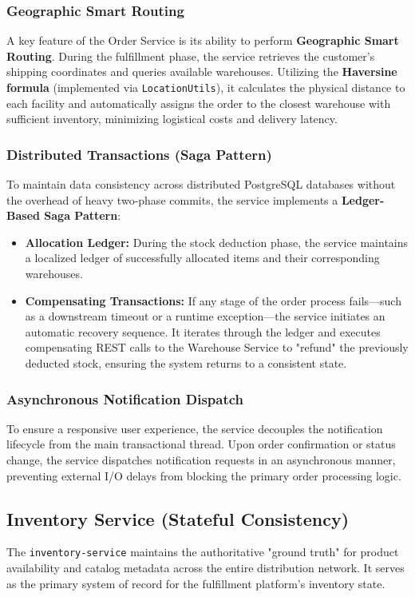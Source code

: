 \documentclass[12pt,a4paper]{report}
\begin{document}
\subsubsection{Geographic Smart Routing}
A key feature of the Order Service is its ability to perform \textbf{Geographic Smart Routing}. During the fulfillment phase, the service retrieves the customer's shipping coordinates and queries available warehouses. Utilizing the \textbf{Haversine formula} (implemented via \texttt{LocationUtils}), it calculates the physical distance to each facility and automatically assigns the order to the closest warehouse with sufficient inventory, minimizing logistical costs and delivery latency.

\subsubsection{Distributed Transactions (Saga Pattern)}
To maintain data consistency across distributed PostgreSQL databases without the overhead of heavy two-phase commits, the service implements a \textbf{Ledger-Based Saga Pattern}:
\begin{itemize}
    \item \textbf{Allocation Ledger:} During the stock deduction phase, the service maintains a localized ledger of successfully allocated items and their corresponding warehouses.
    \item \textbf{Compensating Transactions:} If any stage of the order process fails---such as a downstream timeout or a runtime exception---the service initiates an automatic recovery sequence. It iterates through the ledger and executes compensating REST calls to the Warehouse Service to "refund" the previously deducted stock, ensuring the system returns to a consistent state.
\end{itemize}

\subsubsection{Asynchronous Notification Dispatch}
To ensure a responsive user experience, the service decouples the notification lifecycle from the main transactional thread. Upon order confirmation or status change, the service dispatches notification requests in an asynchronous manner, preventing external I/O delays from blocking the primary order processing logic.

\subsection{Inventory Service (Stateful Consistency)}
The \texttt{inventory-service} maintains the authoritative "ground truth" for product availability and catalog metadata across the entire distribution network. It serves as the primary system of record for the fulfillment platform's inventory state.
\end{document}
